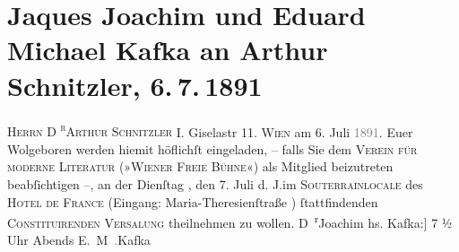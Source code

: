 

         \renewcommand{\erwaehnteInstitutionen}{Institutionen: »Freie Bühne« Verein für moderne Literatur}
         \renewcommand{\erwaehnteOrte}{Orte: Bösendorferstraße, Hotel de France, Maria-Theresienstraße, Wien, Wipplingerstraße}
         \renewcommand{\erwaehnteWerke}{}
               \section[Jaques Joachim und Eduard Michael Kafka an Arthur Schnitzler, 6. 7. 1891]{ Jaques Joachim und Eduard Michael Kafka an Arthur Schnitzler, 6. 7. 1891}\nopagebreak{}\rehead{ }\begin{ledgroupsized}[t]{13cm}\normalsize\beginnumbering \toendnotes[C]{\smallbreak\pagebreak[2]} 
\toendnotes[C]{\smallbreak}\pstart{}{\pb}\textsc{Herrn D \textsuperscript{r}Arthur Schnitzler }\pend{}\pstart{}I. Giselastr 11. \pend{}{\bigskip}\pstart
           \centering{}{\pb}\textsc{Wien} am 6. Juli \textcolor{gray}{1891}. \pend
           \pstart\center{}Euer Wolgeboren\pend\pstart
           werden hiemit höflichſt eingeladen, – falls Sie dem \pend
           \pstart
           \centering{}\textsc{Verein für moderne Literatur (»Wiener Freie Bühne«) }\pend
           \pstart
           \noindent{}als Mitglied beizutreten beabſichtigen –, an der Dienſtag , den 7.
                  Juli d. J.im \textsc{Souterrainlocale} des \textsc{Hotel de France} (Eingang: Maria-Theresienſtraße ){ }ſtattfindenden \pend
           \pstart
           \centering{}\textsc{Constituirenden Versa{\geminationm}lung }\pend
           \pstart
           \noindent{}theilnehmen zu wollen.\pend
           \pstart \spacefill\mbox{D \textsuperscript{r}Joachim}\pend{}\pstart
           \noindent{}\centering{}{[}hs. Kafka:{]} 7 ½ Uhr Abends\pend
           \pstart \spacefill\mbox{E. M \textcolor{gray}{.}Kafka}\pend{}\pstart
           \noindent{}\label{T_L00022_1v}\label{T_L00022_1h}\pend
           

\end{ledgroupsized}
